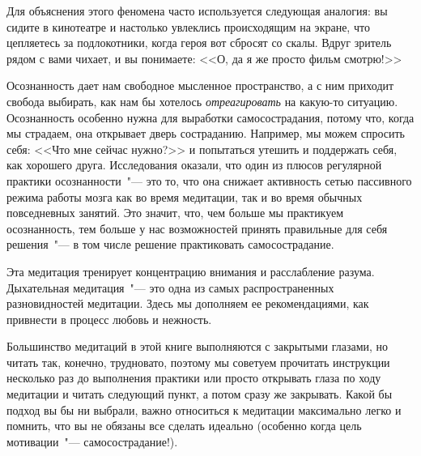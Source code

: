 Для объяснения этого феномена часто используется следующая аналогия: вы сидите в кинотеатре и настолько увлеклись происходящим на экране, что цепляетесь за подлокотники, когда героя вот сбросят со скалы. Вдруг зритель рядом с вами чихает, и вы понимаете: <<О, да я же просто фильм смотрю!>>

Осознанность дает нам свободное мысленное пространство, а с  ним приходит свобода выбирать, как нам бы хотелось \emph{отреагировать} на какую-то ситуацию. Осознанность особенно нужна для выработки самосострадания, потому что, когда мы страдаем, она открывает дверь состраданию. Например, мы можем спросить себя: <<Что мне сейчас нужно?>> и попытаться утешить и поддержать себя, как хорошего друга. Исследования оказали, что один из плюсов регулярной практики осознанности~"--- это то, что она снижает активность сетью пассивного режима работы мозга как во время медитации, так и во время обычных повседневных занятий. Это значит, что, чем больше мы практикуем осознанность, тем больше у нас возможностей принять правильные для себя решения~"--- в том числе решение практиковать самосострадание. 

\newpage
{}

Эта медитация тренирует концентрацию внимания и расслабление разума. Дыхательная медитация~"--- это одна из самых распространенных разновидностей медитации. Здесь мы дополняем ее рекомендациями, как привнести в процесс любовь и нежность.

Большинство медитаций в этой книге выполняются с закрытыми глазами, но читать так, конечно, трудновато, поэтому мы советуем прочитать инструкции несколько раз до выполнения практики или просто открывать глаза по ходу медитации и читать следующий пункт, а потом сразу же закрывать. Какой бы подход вы бы ни выбрали, важно относиться к медитации максимально легко и помнить, что вы не обязаны все сделать идеально (особенно когда цель мотивации~"--- самосострадание!).

